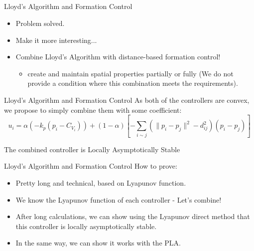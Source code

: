 \documentclass[t]{beamer}
\newcommand{\norm}[1]{\lVert #1 \rVert}
\begin{document}
\subsection[Lloyd's Algorithm and Formation Control]{}
\begin{frame}[label=lloydsandformation1]{Lloyd's Algorithm and Formation Control}
\begin{itemize}
\item<1-> Problem solved.
\item<2-> Make it more interesting...
\item<3-> Combine Lloyd's Algorithm with distance-based formation control! \begin{itemize}
\item<4-> create and maintain spatial properties partially or fully (We do not provide a condition where this combination meets the requirements).
\end{itemize}
\end{itemize}
\end{frame}

\begin{frame}[label=lloydsandformation2]{Lloyd's Algorithm and Formation Control}
As both of the controllers are convex, we propose to simply combine them with some coefficient:\\
\begin{equation}
    u_{i} = \alpha \left(-k_{p}\left( p_i -C_{V_{i}} \right)\right) +
    \left( 1-\alpha \right)\left[-\sum_{i \sim j} \left( \norm{p_{i} - p_{j}}^{2} - d_{ij}^2 \right) \left( p_{i} - p_{j} \right)  \right] 
    \label{Combined Controller}
\end{equation}\pause
\begin{theorem}
The combined controller is Locally Asymptotically Stable
\end{theorem}
\end{frame}

\begin{frame}[label=lloydsandformation3]{Lloyd's Algorithm and Formation Control}
How to prove:
\begin{itemize}
\item Pretty long and technical, based on Lyapunov function.
\item We know the Lyapunov function of each controller - Let's combine!
\item After long calculations, we can show using the Lyapunov direct method that this controller is locally asymptotically stable.
\item In the same way, we can show it works with the PLA.
\end{itemize}
\end{frame}
\end{document}
